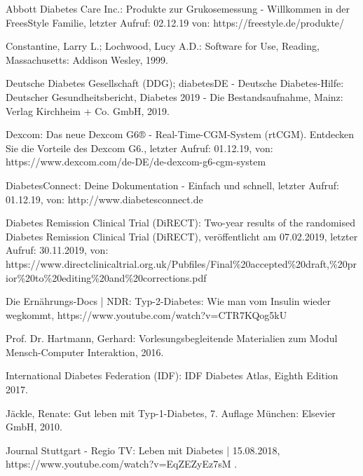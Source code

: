 	
	\begin{thebibliography}{1}
		
		Abbott Diabetes Care Inc.:
		Produkte zur Grukosemessung - Willkommen in der FreesStyle Familie, letzter Aufruf: 02.12.19 von:
		https://freestyle.de/produkte/	
		
		Constantine, Larry L.; Lochwood, Lucy A.D.: 
		Software for Use, 
		Reading, Massachusetts: Addison Wesley,
		1999.
		
		Deutsche Diabetes Gesellschaft (DDG); diabetesDE - Deutsche Diabetes-Hilfe:
		Deutscher Gesundheitsbericht, Diabetes 2019 - Die Bestandsaufnahme, 
		Mainz: Verlag Kirchheim + Co. GmbH,
		2019.
		
		Dexcom:
		Das neue Dexcom G6® - Real-Time-CGM-System (rtCGM). Entdecken Sie die Vorteile des Dexcom G6., letzter Aufruf: 01.12.19, von: https://www.dexcom.com/de-DE/de-dexcom-g6-cgm-system
		
		DiabetesConnect:
		Deine Dokumentation - Einfach und schnell, letzter Aufruf: 01.12.19, von: http://www.diabetesconnect.de
		
		Diabetes Remission Clinical Trial (DiRECT):
		Two-year results of the randomised Diabetes Remission Clinical Trial (DiRECT), veröffentlicht am 07.02.2019, \newline
		letzter Aufruf: 30.11.2019, von: https://www.directclinicaltrial.org.uk/Pubfiles/Final\newline\%20accepted\%20draft,\%20prior\%20to\%20editing\%20and\%20corrections.pdf
		
		Die Ernährungs-Docs | NDR:
		Typ-2-Diabetes: Wie man vom Insulin wieder wegkommt, \newline
		https://www.youtube.com/watch?v=CTR7KQog5kU
		
		Prof. Dr. Hartmann, Gerhard: 
		Vorlesungsbegleitende Materialien zum Modul Mensch-Computer Interaktion, 
		2016.
		
		International Diabetes Federation (IDF): 
		IDF Diabetes Atlas, Eighth Edition 2017.
		
		Jäckle, Renate: 
		Gut leben mit Typ-1-Diabetes, 7. Auflage
		München: Elsevier GmbH,
		2010.
		
		Journal Stuttgart - Regio TV: 
		Leben mit Diabetes | 15.08.2018, \newline
		https://www.youtube.com/watch?v=EqZEZyEz7sM .
		

\end{thebibliography}
